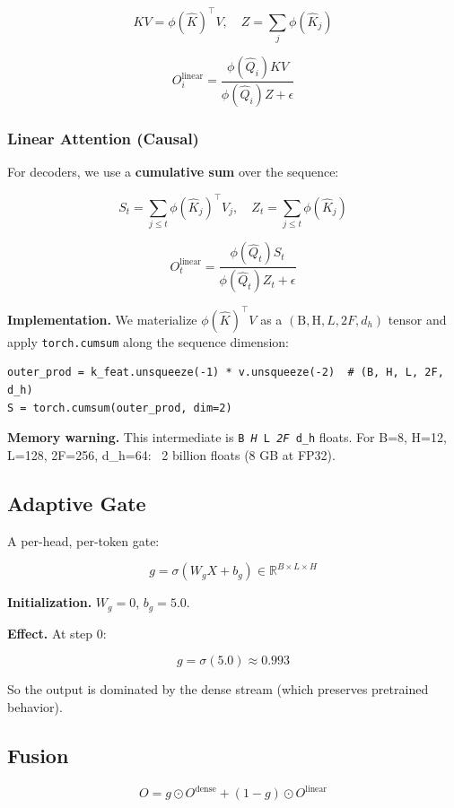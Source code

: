 \[
KV = \phi(\hat{K})^\top V, \quad
Z = \sum_j \phi(\hat{K}_j)
\]

\[
O^\text{linear}_i = \frac{\phi(\hat{Q}_i) KV}{\phi(\hat{Q}_i) Z + \epsilon}
\]

\subsubsection{Linear Attention (Causal)}

For decoders, we use a \textbf{cumulative sum} over the sequence:

\[
S_t = \sum_{j \leq t} \phi(\hat{K}_j)^\top V_j, \quad
Z_t = \sum_{j \leq t} \phi(\hat{K}_j)
\]

\[
O^\text{linear}_t = \frac{\phi(\hat{Q}_t) S_t}{\phi(\hat{Q}_t) Z_t + \epsilon}
\]

\textbf{Implementation.} We materialize $\phi(\hat{K})^\top V$ as a 
$(\text{B}, \text{H}, L, 2F, d_h)$ tensor and apply \texttt{torch.cumsum} along 
the sequence dimension:

\begin{lstlisting}
outer_prod = k_feat.unsqueeze(-1) * v.unsqueeze(-2)  # (B, H, L, 2F, d_h)
S = torch.cumsum(outer_prod, dim=2)
\end{lstlisting}

\textbf{Memory warning.} This intermediate is \texttt{B \textit{ H } L \textit{ 2F } d\_h} floats. 
For B=8, H=12, L=128, 2F=256, d\_h=64: ~2 billion floats (8 GB at FP32).

\subsection{Adaptive Gate}

A per-head, per-token gate:

\[
g = \sigma(W_g X + b_g) \in \mathbb{R}^{B \times L \times H}
\]

\textbf{Initialization.} $W_g = 0$, $b_g = 5.0$.

\textbf{Effect.} At step 0:

\[
g = \sigma(5.0) \approx 0.993
\]

So the output is dominated by the dense stream (which preserves pretrained 
behavior).

\subsection{Fusion}

\[
O = g \odot O^\text{dense} + (1 - g) \odot O^\text{linear}
\]

